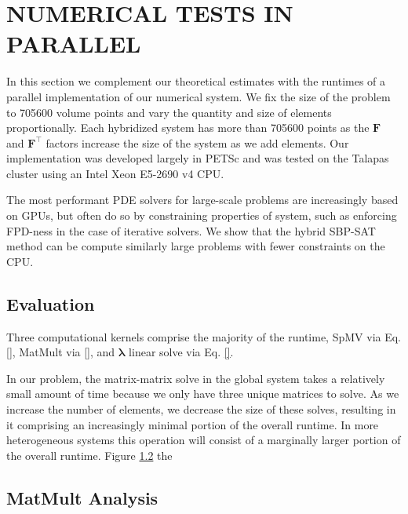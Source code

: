 %
%
%
\section{NUMERICAL TESTS IN PARALLEL}

%
%
%
In this section we complement our theoretical estimates with the runtimes of a parallel implementation of our numerical system. 
We fix the size of the problem to 705600 volume points and vary the quantity and size of elements proportionally. 
Each hybridized system has more than 705600 points as the $\mathbf{F}$ and $\mathbf{F}^{\intercal}$ factors increase the size of the system as we add elements.
Our implementation was developed largely in PETSc and was tested on the Talapas cluster using an Intel Xeon E5-2690 v4 CPU.


 
The most performant PDE solvers for large-scale problems are increasingly based on GPUs, but often do so by constraining properties of system, such as enforcing FPD-ness in the case of iterative solvers. We show that the hybrid SBP-SAT method can be compute similarly large problems with fewer constraints on the CPU.  

\subsection{Evaluation}
Three computational kernels comprise the majority of the runtime, SpMV via Eq. \eqref{}, MatMult via \eqref{}, and $\symbf{\lambda}$ linear solve via Eq. \eqref{}.

In our problem, the matrix-matrix solve in the global system takes a relatively small amount of time because we only have three unique matrices to solve. 
As we increase the number of elements, we decrease the size of these solves, resulting in it comprising an increasingly minimal portion of the overall runtime. 
In more heterogeneous systems this operation will consist of a marginally larger portion of the overall runtime.
Figure \ref{} the 






\subsection{MatMult Analysis}



%	

